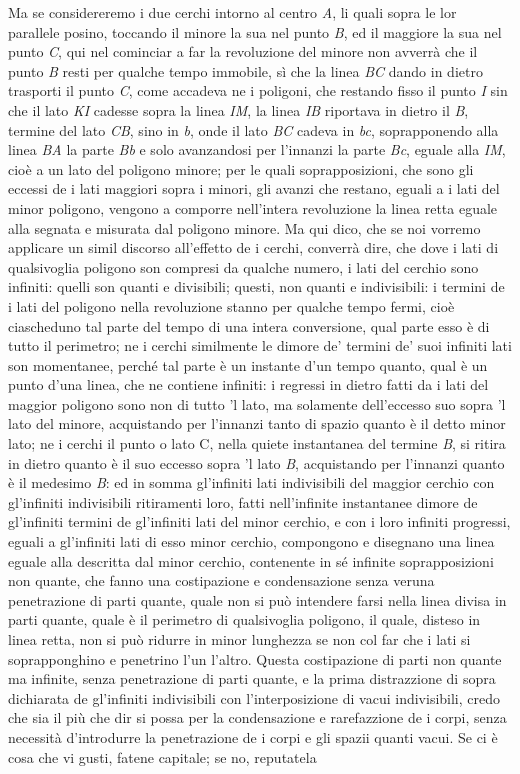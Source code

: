 \documentclass[11pt,twoside,openany]{book}
\begin{document}
Ma se considereremo i due cerchi intorno al centro \emph{A}, li quali sopra le lor parallele posino, toccando il minore la sua nel punto \emph{B}, ed il maggiore la sua nel punto \emph{C}, qui nel cominciar a far la revoluzione del minore non avverrà che il punto \emph{B} resti per qualche tempo immobile, sì che la linea \emph{BC} dando in dietro trasporti il punto \emph{C}, come accadeva ne i poligoni, che restando fisso il punto \emph{I} sin che il lato \emph{KI} cadesse sopra la linea \emph{IM}, la linea \emph{IB} riportava in dietro il \emph{B}, termine del lato \emph{CB}, sino in \emph{b}, onde il lato \emph{BC} cadeva in \emph{bc}, soprapponendo alla linea \emph{BA} la parte \emph{Bb} e solo avanzandosi per l'innanzi la parte \emph{Bc}, eguale alla \emph{IM}, cioè a un lato del poligono minore; per le quali soprapposizioni, che sono gli eccessi de i lati maggiori sopra i minori, gli avanzi che restano, eguali a i lati del minor poligono, vengono a comporre nell'intera revoluzione la linea retta eguale alla segnata e misurata dal poligono minore. Ma qui dico, che se noi vorremo applicare un simil discorso all'effetto de i cerchi, converrà dire, che dove i lati di qualsivoglia poligono son compresi da qualche numero, i lati del cerchio sono infiniti: quelli son quanti e divisibili; questi, non quanti e indivisibili: i termini de i lati del poligono nella revoluzione stanno per qualche tempo fermi, cioè ciascheduno tal parte del tempo di una intera conversione, qual parte esso è di tutto il perimetro; ne i cerchi similmente le dimore de' termini de' suoi infiniti lati son momentanee, perché tal parte è un instante d'un tempo quanto, qual è un punto d'una linea, che ne contiene infiniti: i regressi in dietro fatti da i lati del maggior poligono sono non di tutto 'l lato, ma solamente dell'eccesso suo sopra 'l lato del minore, acquistando per l'innanzi tanto di spazio quanto è il detto minor lato; ne i cerchi il punto o lato C, nella quiete instantanea del termine \emph{B}, si ritira in dietro quanto è il suo eccesso sopra 'l lato \emph{B}, acquistando per l'innanzi quanto è il medesimo \emph{B}: ed in somma gl'infiniti lati indivisibili del maggior cerchio con gl'infiniti indivisibili ritiramenti loro, fatti nell'infinite instantanee dimore de gl'infiniti termini de gl'infiniti lati del minor cerchio, e con i loro infiniti progressi, eguali a gl'infiniti lati di esso minor cerchio, compongono e disegnano una linea eguale alla descritta dal minor cerchio, contenente in sé infinite soprapposizioni non quante, che fanno una costipazione e condensazione senza veruna penetrazione di parti quante, quale non si può intendere farsi nella linea divisa in parti quante, quale è il perimetro di qualsivoglia poligono, il quale, disteso in linea retta, non si può ridurre in minor lunghezza se non col far che i lati si soprapponghino e penetrino l'un l'altro. Questa costipazione di parti non quante ma infinite, senza penetrazione di parti quante, e la prima distrazzione di sopra dichiarata de gl'infiniti indivisibili con l'interposizione di vacui indivisibili, credo che sia il più che dir si possa per la condensazione e rarefazzione de i corpi, senza necessità d'introdurre la penetrazione de i corpi e gli spazii quanti vacui. Se ci è cosa che vi gusti, fatene capitale; se no, reputatela 
\end{document}
